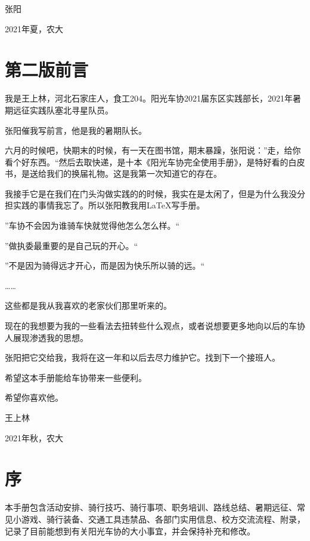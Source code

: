 \documentclass{ctexbook}
\begin{document}
\hfill 张\hspace{3mm}阳 \hspace{10mm}

\hfill 2021年夏，农大\hspace{2mm}


\chapter{第二版前言}
我是王上林，河北石家庄人，食工204。阳光车协2021届东区实践部长，2021年暑期远征实践队塞北寻星队员。

张阳催我写前言，他是我的暑期队长。

六月的时候吧，快期末的时候，有一天在图书馆，期末暴躁，张阳说：''走，给你看个好东西。``然后去取快递，是十本《阳光车协完全使用手册》，是特好看的白皮书，是送给我们的换届礼物。这是我第一次知道它的存在。

我接手它是在我们在门头沟做实践的的时候，我实在是太闲了，但是为什么我没分担实践的事情我忘了。所以张阳教我用\LaTeX 写手册。

''车协不会因为谁骑车快就觉得他怎么怎么样。``

''做执委最重要的是自己玩的开心。``

''不是因为骑得远才开心，而是因为快乐所以骑的远。``

……

这些都是我从我喜欢的老家伙们那里听来的。

现在的我想要为我的一些看法去扭转些什么观点，或者说想要更多地向以后的车协人展现渗透我的思想。

张阳把它交给我，我将在这一年和以后去尽力维护它。找到下一个接班人。

希望这本手册能给车协带来一些便利。

希望你喜欢他。

\hfill 王\hspace{3mm}上\hspace{3mm}林 \hspace{10mm}

\hfill 2021年秋，农大\hspace{2mm}

\chapter{序}
本手册包含活动安排、骑行技巧、骑行事项、职务培训、路线总结、暑期远征、常见小游戏、骑行装备、交通工具违禁品、各部门实用信息、校方交流流程、附录，记录了目前能想到有关阳光车协的大小事宜，并会保持补充和修改。
\end{document}

